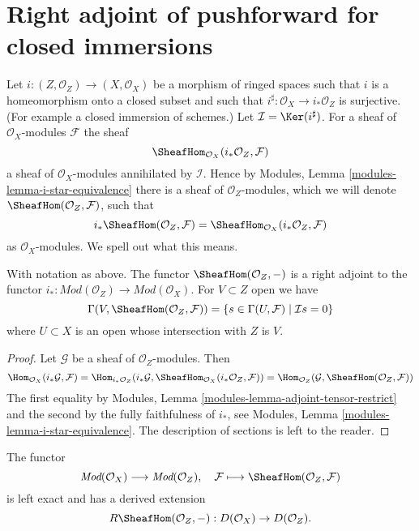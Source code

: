 \section{Right adjoint of pushforward for closed immersions}
\label{section-sections-with-exact-support}

\noindent
Let $i : (Z, \mathcal{O}_Z) \to (X, \mathcal{O}_X)$ be a morphism
of ringed spaces such that $i$ is a homeomorphism onto a closed
subset and such that $i^\sharp : \mathcal{O}_X \to i_*\mathcal{O}_Z$
is surjective. (For example a closed immersion of schemes.)
Let $\mathcal{I} = \Ker(i^\sharp)$. For a sheaf
of $\mathcal{O}_X$-modules $\mathcal{F}$ the sheaf
$$
\SheafHom_{\mathcal{O}_X}(i_*\mathcal{O}_Z, \mathcal{F})
$$
a sheaf of $\mathcal{O}_X$-modules annihilated by $\mathcal{I}$.
Hence by Modules, Lemma \ref{modules-lemma-i-star-equivalence}
there is a sheaf of $\mathcal{O}_Z$-modules,
which we will denote $\SheafHom(\mathcal{O}_Z, \mathcal{F})$,
such that
$$
i_*\SheafHom(\mathcal{O}_Z, \mathcal{F}) =
\SheafHom_{\mathcal{O}_X}(i_*\mathcal{O}_Z, \mathcal{F})
$$
as $\mathcal{O}_X$-modules. We spell out what this means.

\begin{lemma}
\label{lemma-compute-sheaf-with-exact-support}
With notation as above. The functor $\SheafHom(\mathcal{O}_Z, -)$ is a
right adjoint to the functor
$i_* : \textit{Mod}(\mathcal{O}_Z) \to \textit{Mod}(\mathcal{O}_X)$.
For $V \subset Z$ open we have
$$
\Gamma(V, \SheafHom(\mathcal{O}_Z, \mathcal{F})) =
\{s \in \Gamma(U, \mathcal{F}) \mid \mathcal{I}s = 0\}
$$
where $U \subset X$ is an open whose intersection with $Z$ is $V$.
\end{lemma}

\begin{proof}
Let $\mathcal{G}$ be a sheaf of $\mathcal{O}_Z$-modules. Then
$$
\Hom_{\mathcal{O}_X}(i_*\mathcal{G}, \mathcal{F}) =
\Hom_{i_*\mathcal{O}_Z}(i_*\mathcal{G},
\SheafHom_{\mathcal{O}_X}(i_*\mathcal{O}_Z, \mathcal{F})) =
\Hom_{\mathcal{O}_Z}(\mathcal{G}, \SheafHom(\mathcal{O}_Z, \mathcal{F}))
$$
The first equality by
Modules, Lemma \ref{modules-lemma-adjoint-tensor-restrict}
and the second by the fully faithfulness of $i_*$, see
Modules, Lemma \ref{modules-lemma-i-star-equivalence}.
The description of sections is left to the reader.
\end{proof}

\noindent
The functor
$$
\textit{Mod}(\mathcal{O}_X)
\longrightarrow
\textit{Mod}(\mathcal{O}_Z),
\quad
\mathcal{F} \longmapsto \SheafHom(\mathcal{O}_Z, \mathcal{F})
$$
is left exact and has a derived extension
$$
R\SheafHom(\mathcal{O}_Z, -) : D(\mathcal{O}_X) \to D(\mathcal{O}_Z).
$$

